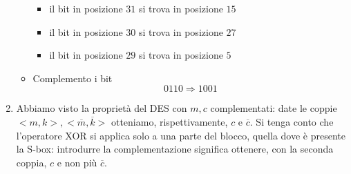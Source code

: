 \begin{framed}
\begin{enumerate}
\begin{itemize}
\begin{itemize}
				\item  il bit in posizione $31$ si trova in posizione $15$
				
				\item  il bit in posizione $30$ si trova in posizione $27$
				
				\item  il bit in posizione $29$ si trova in posizione $5$
			\end{itemize}
			\item Complemento i bit
			$$0110 \Longrightarrow 1001$$
		\end{itemize}
		\item Abbiamo visto la proprietà del DES con $m,c$ complementati: date le coppie $<m,k>, <\overline{m},\overline{k}>$ otteniamo, rispettivamente, $c$ e $\overline{c}$. Si tenga conto che l'operatore XOR si applica solo a una parte del blocco, quella dove è presente la S-box: introdurre la complementazione significa ottenere, con la seconda coppia, $c$ e non più $\overline{c}$.
	\end{enumerate}
\end{framed} 

